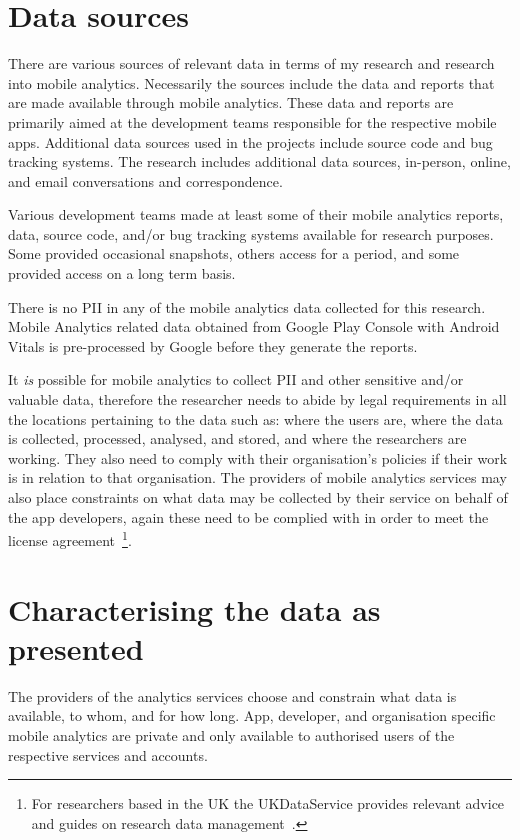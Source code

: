 \section{Data sources}
\label{section-case-studies-data-sources}

There are various sources of relevant data in terms of my research and research into mobile analytics. Necessarily the sources include the data and reports that are made available through mobile analytics. These data and reports are primarily aimed at the development teams responsible for the respective mobile apps. Additional data sources used in the projects include source code and bug tracking systems. The research includes additional data sources, in-person, online, and email conversations and correspondence.  

Various development teams made at least some of their mobile analytics reports, data, source code, and/or bug tracking systems available for research purposes. Some provided occasional snapshots, others access for a period, and some provided access on a long term basis.

There is no PII in any of the mobile analytics data collected for this research. Mobile Analytics related data obtained from Google Play Console with Android Vitals is pre-processed by Google before they generate the reports. 

It \emph{is} possible for mobile analytics to collect PII and other sensitive and/or valuable data, therefore the researcher needs to abide by legal requirements in all the locations pertaining to the data such as: where the users are, where the data is collected, processed, analysed, and stored, and where the researchers are working. They also need to comply with their organisation's policies if their work is in relation to that organisation. The providers of mobile analytics services may also place constraints on what data may be collected by their service on behalf of the app developers, again these need to be complied with in order to meet the license agreement~\footnote{For researchers based in the UK the UKDataService provides relevant advice and guides on research data management~\citep{ukdataservice2021_research_data_management}.}. 

\section{Characterising the data as presented}
The providers of the analytics services choose and constrain what data is available, to whom, and for how long. App, developer, and organisation specific mobile analytics are private and only available to authorised users of the respective services and accounts.

